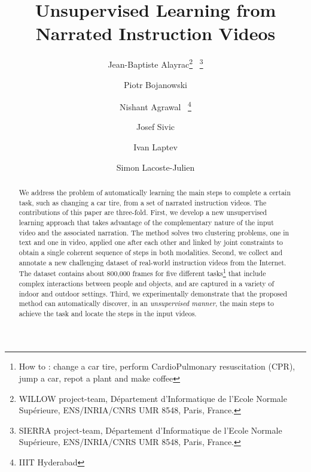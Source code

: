 \documentclass[10pt,twocolumn,letterpaper]{article}
\begin{document}
\title{Unsupervised Learning from Narrated Instruction Videos}

\author{
Jean-Baptiste Alayrac\thanks{WILLOW project-team, D\'{e}partement d'Informatique de l'Ecole Normale Sup\'{e}rieure, ENS/INRIA/CNRS UMR 8548, Paris, France.} \ \thanks{SIERRA project-team, D\'epartement d'Informatique de l'Ecole Normale Sup\'{e}rieure, ENS/INRIA/CNRS UMR 8548, Paris, France.}
\and
Piotr Bojanowski\footnotemark[1]
\and
Nishant Agrawal \footnotemark[1] \ \thanks{IIIT Hyderabad} 
\and
Josef Sivic\footnotemark[1]
\and
Ivan Laptev\footnotemark[1] 
\and
Simon Lacoste-Julien\footnotemark[2] 
}

\maketitle

\begin{abstract}
   We address the problem of automatically learning the main steps to complete a certain task, such as changing a car tire, 
from a set of narrated instruction videos. 
The contributions of this paper are three-fold.
First, we develop a new unsupervised learning approach that takes advantage of the complementary nature of the input video and the associated narration.   
The method solves two clustering problems, one in text and one in video, applied one after each other and linked by joint constraints to obtain a single coherent sequence of steps in both modalities.  
Second, we collect and annotate a new challenging dataset of real-world instruction videos from the Internet. The dataset contains about 800,000 frames for five different tasks\footnote{How to : change a car tire, perform CardioPulmonary resuscitation (CPR), jump a car, repot a plant and make coffee} that include complex interactions between people and objects, and are captured in a variety of indoor and outdoor settings.	
Third, we experimentally demonstrate that the proposed method can automatically discover, in an \emph{unsupervised manner}, the main steps to achieve the task and locate the steps in the input videos. 
\end{abstract}
\end{document}
